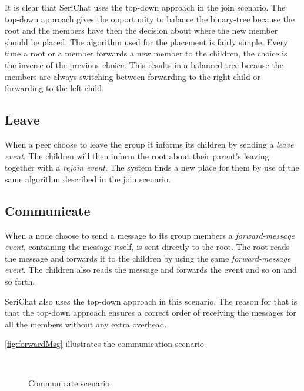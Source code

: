 It is clear that SeriChat uses the top-down approach in the join scenario. The top-down approach gives the opportunity to balance the binary-tree because the root and the members have then the decision about where the new member should be placed. The algorithm used for the placement is fairly simple. Every time a root or a member forwards a new member to the children, the choice is the inverse of the previous choice. This results in a balanced tree because the members are always switching between forwarding to the right-child or forwarding to the left-child.

\subsection{Leave}
When a peer choose to leave the group it informs its children by sending a \emph{leave event}. The children will then inform the root about their parent's leaving together with a \emph{rejoin event}. The system finds a new place for them by use of the same algorithm described in the join scenario.

\subsection{Communicate}
When a node choose to send a message to its group members a \emph{forward-message event}, containing the message itself,  is sent directly to the root. The root reads the message and forwards it to the children by using the same \emph{forward-message event}. The children also reads the message and forwards the event and so on and so forth.

SeriChat also uses the top-down approach in this scenario. The reason for that is that the top-down approach ensures a correct order of receiving the messages for all the members without any extra overhead.

\autoref{fig:forwardMsg} illustrates the communication scenario.
\begin{figure}[bth]
	\myfloatalign
	 \quad
	 \\
	\caption{Communicate scenario}\label{fig:forwardMsg}
\end{figure}

